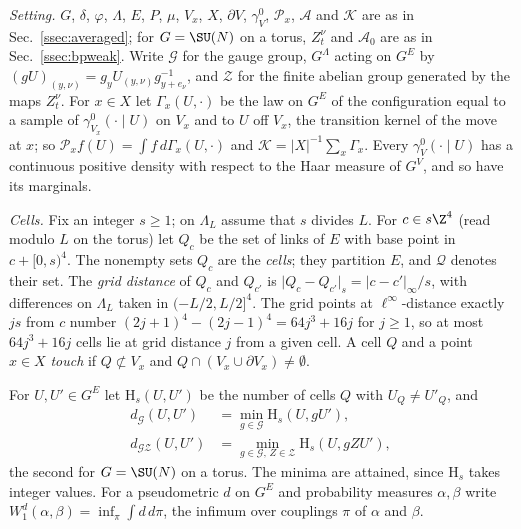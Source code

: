\emph{Setting.} $G$, $\delta$, $\varphi$, $\Lambda$, $E$, $P$, $\mu$, $V_x$,
$X$, $\partial V$, $\gamma^0_V$, $\mathcal P_x$, $\mathcal A$ and $\mathcal K$
are as in Sec.~\ref{ssec:averaged}; for $G=\SU(N)$ on a torus, $Z^\nu_t$ and
$\mathcal A_0$ are as in Sec.~\ref{ssec:bpweak}. Write $\mathcal G$ for the
gauge group, $G^{\Lambda}$ acting on $G^E$ by $(gU)_{(y,\nu)}=g_yU_{(y,\nu)}
g_{y+e_\nu}^{-1}$, and $\mathcal Z$ for the finite abelian group generated by
the maps $Z^\nu_t$. For $x\in X$ let $\Gamma_x(U,\cdot)$ be the law on $G^E$
of the configuration equal to a sample of $\gamma^0_{V_x}(\cdot\mid U)$ on
$V_x$ and to $U$ off $V_x$, the transition kernel of the move at $x$; so
$\mathcal P_xf(U)=\int f\,d\Gamma_x(U,\cdot)$ and $\mathcal K=\lvert X\rvert
^{-1}\sum_x\Gamma_x$. Every $\gamma^0_V(\cdot\mid U)$ has a continuous
positive density with respect to the Haar measure of $G^V$, and so have its
marginals.

\emph{Cells.} Fix an integer $s\ge1$; on $\Lambda_L$ assume that $s$ divides
$L$. For $c\in s\Z^4$ (read modulo $L$ on the torus) let $Q_c$ be the set of
links of $E$ with base point in $c+[0,s)^4$. The nonempty sets $Q_c$ are the
\emph{cells}; they partition $E$, and $\mathcal Q$ denotes their set. The
\emph{grid distance} of $Q_c$ and $Q_{c'}$ is $\lvert Q_c-Q_{c'}\rvert_s=
\lvert c-c'\rvert_\infty/s$, with differences on $\Lambda_L$ taken in
$(-L/2,L/2]^4$. The grid points at $\ell^\infty$-distance exactly $js$ from
$c$ number $(2j+1)^4-(2j-1)^4=64j^3+16j$ for $j\ge1$, so at most $64j^3+16j$
cells lie at grid distance $j$ from a given cell. A cell $Q$ and a point $x\in
X$ \emph{touch} if $Q\not\subset V_x$ and $Q\cap(V_x\cup\partial V_x)\ne
\emptyset$.

For $U,U'\in G^E$ let $\mathrm{H}_s(U,U')$ be the number of cells $Q$ with
$U_Q\ne U'_Q$, and
\[
\begin{split}
d_{\mathcal G}(U,U')&=\min_{g\in\mathcal G}\mathrm H_s(U,gU'),\\
d_{\mathcal{GZ}}(U,U')&=\min_{g\in\mathcal G,\,Z\in\mathcal Z}\mathrm H_s(U,
gZU'),
\end{split}
\]
the second for $G=\SU(N)$ on a torus. The minima are attained, since $\mathrm
H_s$ takes integer values. For a pseudometric $d$ on $G^E$ and probability
measures $\alpha,\beta$ write $W_1^d(\alpha,\beta)=\inf_\pi\int d\,d\pi$, the
infimum over couplings $\pi$ of $\alpha$ and $\beta$.

